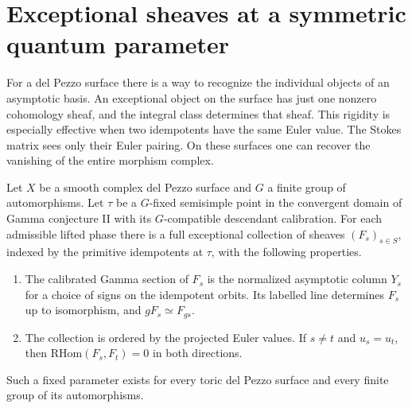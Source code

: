 \section{Exceptional sheaves at a symmetric quantum parameter}\label{sec:surfaces}

For a del Pezzo surface there is a way to recognize the individual objects of an asymptotic basis. An exceptional object on the surface has just one nonzero cohomology sheaf, and the integral class determines that sheaf. This rigidity is especially effective when two idempotents have the same Euler value. The Stokes matrix sees only their Euler pairing. On these surfaces one can recover the vanishing of the entire morphism complex.

\begin{theorem}\label{thm:surface}
Let $X$ be a smooth complex del Pezzo surface and $G$ a finite group of automorphisms. Let $\tau$ be a $G$-fixed semisimple point in the convergent domain of Gamma conjecture II with its $G$-compatible descendant calibration. For each admissible lifted phase there is a full exceptional collection of sheaves $(F_s)_{s\in S}$, indexed by the primitive idempotents at $\tau$, with the following properties.
\begin{enumerate}
\item The calibrated Gamma section of $F_s$ is the normalized asymptotic column $Y_s$ for a choice of signs on the idempotent orbits. Its labelled line determines $F_s$ up to isomorphism, and $gF_s\simeq F_{gs}$.
\item The collection is ordered by the projected Euler values. If $s\ne t$ and $u_s=u_t$, then $\mathrm{RHom}(F_s,F_t)=0$ in both directions.
\end{enumerate}
Such a fixed parameter exists for every toric del Pezzo surface and every finite group of its automorphisms.
\end{theorem}


